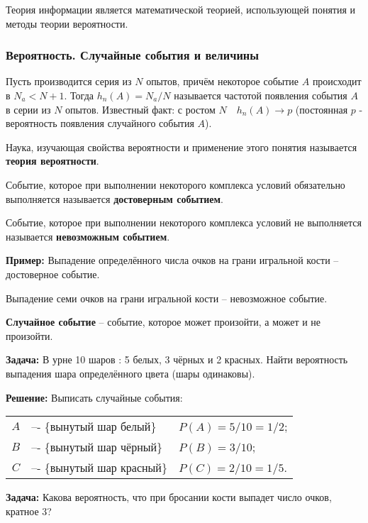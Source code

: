 \documentclass[a4paper,12pt]{report}
\newcommand*{\term}[1]{\textbf{#1}}
\newcommand*{\sample}[1]{\rule{0pt}{10mm}\textbf{#1}}
\newcommand*{\task}[1]{\rule{0pt}{10mm}\textbf{#1}}
\newcommand*{\rtask}[1]{\rule{0pt}{10mm}\textbf{#1}}
\begin{document}
	Теория информации является математической теорией, использующей понятия и методы теории вероятности.





\subsubsection{Вероятность. Случайные события и величины}

	Пусть производится серия из $N$ опытов, причём некоторое событие $A$ происходит в $N_a < N+1$. Тогда $h_n(A) = N_a/N $ называется частотой появления события $A$ в серии из $N$ опытов. 
	Известный факт: с ростом $N \quad h_n(A) \rightarrow p$ (постоянная $p$ - вероятность появления случайного события $A$).

	Наука, изучающая свойства вероятности и применение этого понятия называется \term{теория вероятности}.

	Событие, которое при выполнении некоторого комплекса условий обязательно выполняется называется \term{достоверным событием}.

	Событие, которое при выполнении некоторого комплекса условий не выполняется называется \term{невозможным событием}.

	\sample{Пример:} Выпадение определённого числа очков на грани игральной кости  -- достоверное событие.

	Выпадение семи очков на грани игральной кости -- невозможное событие.

	\term{Случайное событие} – событие, которое может произойти, а может и не произойти.


	\task{Задача:} В урне 10 шаров : 5 белых, 3 чёрных и 2 красных. Найти вероятность выпадения шара определённого цвета (шары одинаковы).

	\rtask{Решение:} Выписать случайные события:


	\begin{tabular}{rll}

		$A$ & –- \{вынутый шар белый\} & $P(A) = 5/10 = 1/2$;\\
		$B$ & –- \{вынутый шар чёрный\} & $P(B) = 3/10$;\\
		$C$ & –- \{вынутый шар красный\} & $P(C) = 2/10 = 1/5$.\\

	\end{tabular}


	\task{Задача:} Какова вероятность, что при бросании кости выпадет число очков, кратное 3?
\end{document}
